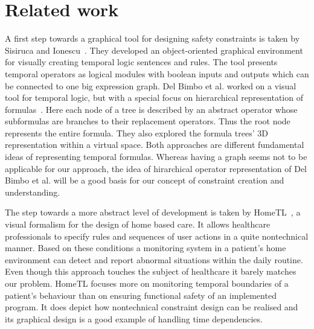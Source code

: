 





\section{Related work}
\label{sec:relatedwork}





A first step towards a graphical tool for designing safety constraints is taken by Sisiruca and Ionescu~\cite{332301}. They developed an object-oriented graphical environment for visually creating temporal logic sentences and rules. The tool presents temporal operators as logical modules with boolean inputs and outputs which can be connected to one big expression graph. Del Bimbo et al. worked on a visual tool for temporal logic, but with a special focus on hierarchical representation of formulas~\cite{520786}. Here each node of a tree is described by an abstract operator whose subformulas are branches to their replacement operators. Thus the root node represents the entire formula. They also explored the formula trees' 3D representation within a virtual space. Both approaches are different fundamental ideas of representing temporal formulas. Whereas having a graph  seems not to be applicable for our approach, the idea of hirarchical operator representation of Del Bimbo et al. will be a good basis for our concept of constraint creation and understanding.


The step towards a more abstract level of development is taken by HomeTL~\cite{4341725}, a visual formalism for the design of home based care. It allows healthcare professionals to specify rules and sequences of user actions in a quite nontechnical manner. Based on these conditions a monitoring system in a patient's home environment can detect and report abnormal situations within the daily routine. Even though this approach touches the subject of healthcare it barely matches our problem. HomeTL focuses more on monitoring temporal boundaries of a patient's behaviour than on ensuring functional safety of an implemented program. It does depict how nontechnical constraint design can be realised and its graphical design is a good example of handling time dependencies.

